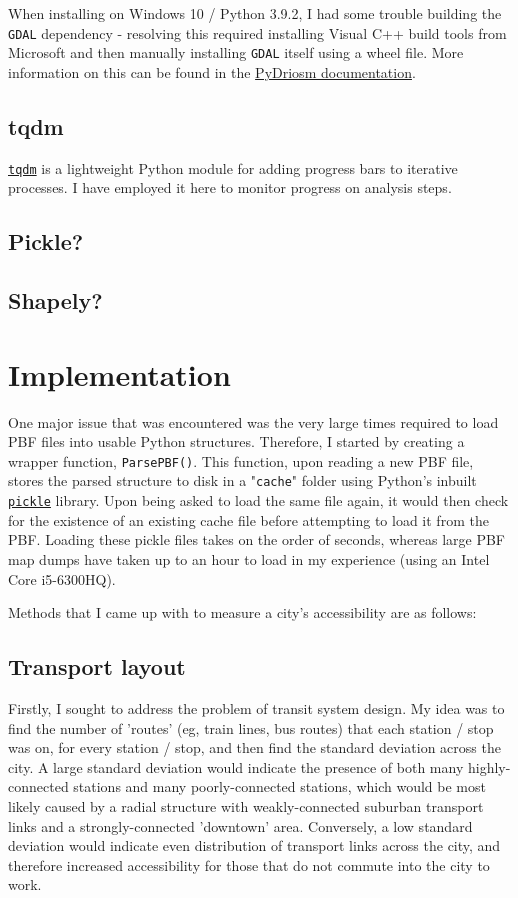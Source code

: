 \documentclass[11pt]{article} %
\begin{document}
When installing on Windows 10 / Python 3.9.2, I had some trouble building the \texttt{GDAL} dependency - resolving this required installing Visual C++ build tools from Microsoft and then manually installing \texttt{GDAL} itself using a wheel file. More information on this can be found in the \href{https://pydriosm.readthedocs.io/en/latest/installation.html}{PyDriosm documentation}.

\subsection{tqdm}
\href{https://tqdm.github.io/}{\texttt{tqdm}} is a lightweight Python module for adding progress bars to iterative processes. I have employed it here to monitor progress on analysis steps.

\subsection{Pickle?}

\subsection{Shapely?}


\section{Implementation}
One major issue that was encountered was the very large times required to load PBF files into usable Python structures. Therefore, I started by creating a wrapper function, \texttt{ParsePBF()}. This function, upon reading a new PBF file, stores the parsed structure to disk in a "\texttt{cache}" folder using Python's inbuilt \href{https://docs.python.org/3/library/pickle.html}{\texttt{pickle}} library. Upon being asked to load the same file again, it would then check for the existence of an existing cache file before attempting to load it from the PBF. Loading these pickle files takes on the order of seconds, whereas large PBF map dumps have taken up to an hour to load in my experience (using an Intel Core i5-6300HQ).

Methods that I came up with to measure a city's accessibility are as follows:

\subsection{Transport layout}
Firstly, I sought to address the problem of transit system design. My idea was to find the number of 'routes' (eg, train lines, bus routes) that each station / stop was on, for every station / stop, and then find the standard deviation across the city. A large standard deviation would indicate the presence of both many highly-connected stations and many poorly-connected stations, which would be most likely caused by a radial structure with weakly-connected suburban transport links and a strongly-connected 'downtown' area. Conversely, a low standard deviation would indicate even distribution of transport links across the city, and therefore increased accessibility for those that do not commute into the city to work.
\end{document}
